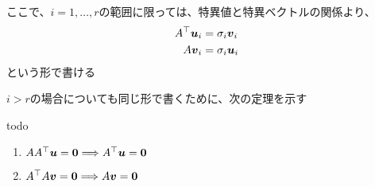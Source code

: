 \documentclass[../../../topic_linear-algebra]{subfiles}
\begin{document}
\br

ここで、$i = 1,\ldots,r$の範囲に限っては、特異値と特異ベクトルの関係より、
\begin{align*}
  A^\top \vb*{u}_i & = \sigma_i \vb*{v}_i \\
  A\vb*{v}_i       & = \sigma_i \vb*{u}_i
\end{align*}
という形で書ける

$i >r$の場合についても同じ形で書くために、次の定理を示す

\begin{theorem}{todo}
  \begin{enumerate}[label=\romanlabel]
    \item $AA^\top \vb*{u} = \vb*{0} \Longrightarrow A^\top \vb*{u} = \vb*{0}$
    \item $A^\top A \vb*{v} = \vb*{0} \Longrightarrow A\vb*{v} = \vb*{0}$
  \end{enumerate}
\end{theorem}
\end{document}
